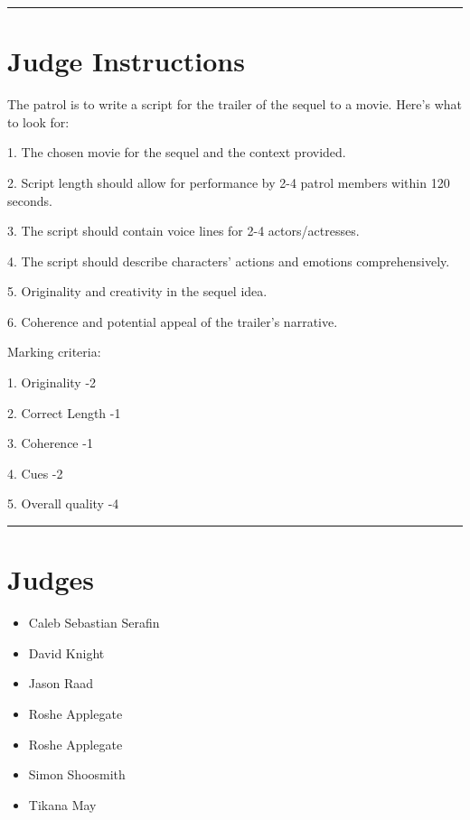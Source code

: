 \documentclass[10pt]{article}
\begin{document}
	\vspace{0.5cm}
	\hrule
	\vspace{0.5cm}

		\section*{Judge Instructions}
		The patrol is to write a script for the trailer of the sequel to a movie. Here's what to look for:



1. The chosen movie for the sequel and the context provided.

2. Script length should allow for performance by 2-4 patrol members within 120 seconds.

3. The script should contain voice lines for 2-4 actors/actresses.

4. The script should describe characters' actions and emotions comprehensively.

5. Originality and creativity in the sequel idea.

6. Coherence and potential appeal of the trailer's narrative.

Marking criteria:

1. Originality -2

2. Correct Length -1

3. Coherence -1

4. Cues -2

5. Overall quality -4


\vspace{0.5cm}
	\hrule
	\vspace{0.5cm}
		\section*{\faUsers \: Judges}

		

	\begin{multicols}{2}

		\begin{itemize}
									\item Caleb Sebastian Serafin
									\item David Knight
									\item Jason Raad
									\item Roshe Applegate
						\end{itemize}

		\vfill\null
		\columnbreak

		\begin{itemize}
									\item Roshe Applegate
									\item Simon Shoosmith
									\item Tikana May
						\end{itemize}

		\vfill\null

		\end{multicols}
\end{document}
